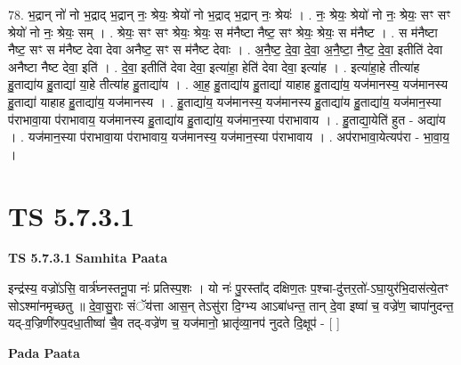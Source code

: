 \documentclass[17pt]{extarticle}
\begin{document}
78. भ॒द्रान् नो॑ नो भ॒द्राद् भ॒द्रान् नः॒ श्रेयः॒ श्रेयो॑ नो भ॒द्राद् भ॒द्रान् नः॒ श्रेयः॑ । . नः॒ श्रेयः॒ श्रेयो॑ नो नः॒ श्रेयः॒ सꣳ सꣳ श्रेयो॑ नो नः॒ श्रेयः॒ सम् । . श्रेयः॒ सꣳ सꣳ श्रेयः॒ श्रेयः॒ स म॑नैष्टा नैष्ट॒ सꣳ श्रेयः॒ श्रेयः॒ स म॑नैष्ट । . स म॑नैष्टा नैष्ट॒ सꣳ स म॑नैष्ट देवा देवा अनैष्ट॒ सꣳ स म॑नैष्ट देवाः । . अ॒नै॒ष्ट॒ दे॒वा॒ दे॒वा॒ अ॒नै॒ष्टा॒ नै॒ष्ट॒ दे॒वा॒ इतीति॑ देवा अनैष्टा नैष्ट देवा॒ इति॑ । . दे॒वा॒ इतीति॑ देवा देवा॒ इत्या॑हा॒ हेति॑ देवा देवा॒ इत्या॑ह । . इत्या॑हा॒हे तीत्या॑ह हु॒ताद्या॑य हु॒ताद्या॑ या॒हे तीत्या॑ह हु॒ताद्या॑य । . आ॒ह॒ हु॒ताद्या॑य हु॒ताद्या॑ याहाह हु॒ताद्या॑य॒ यज॑मानस्य॒ यज॑मानस्य हु॒ताद्या॑ याहाह हु॒ताद्या॑य॒ यज॑मानस्य । . हु॒ताद्या॑य॒ यज॑मानस्य॒ यज॑मानस्य हु॒ताद्या॑य हु॒ताद्या॑य॒ यज॑मान॒स्या प॑राभावा॒या प॑राभावाय॒ यज॑मानस्य हु॒ताद्या॑य हु॒ताद्या॑य॒ यज॑मान॒स्या प॑राभावाय । . हु॒ताद्या॒येति॑ हुत - अद्या॑य । . यज॑मान॒स्या प॑राभावा॒या प॑राभावाय॒ यज॑मानस्य॒ यज॑मान॒स्या प॑राभावाय । . अप॑राभावा॒येत्यप॑रा - भा॒वा॒य॒ । \newline
\pagebreak
{}

\section{ TS 5.7.3.1 }

\textbf{TS 5.7.3.1 } \newline
\textbf{Samhita Paata} \newline

इन्द्र॑स्य॒ वज्रो॑ऽसि॒ वार्त्र॑घ्नस्तनू॒पा नः॑ प्रतिस्प॒शः । यो नः॑ पु॒रस्ता᳚द् दक्षिण॒तः प॒श्चा-दु॑त्तर॒तो॑-ऽघा॒युर॑भि॒दास॑त्ये॒तꣳ सोऽश्मा॑नमृच्छतु ॥ दे॒वा॒सु॒राः संॅय॑त्ता आस॒न् तेऽसु॑रा दि॒ग्भ्य आऽबा॑धन्त॒ तान् दे॒वा इष्वा॑ च॒ वज्रे॑ण॒ चापा॑नुदन्त॒ यद्-व॒ज्रिणी॑रुप॒दधा॒तीष्वा॑ चै॒व तद्-वज्रे॑ण च॒ यज॑मानो॒ भ्रातृ॑व्या॒नप॑ नुदते दि॒क्षूप॑ - [  ] \newline

\textbf{Pada Paata} \newline
\end{document}
